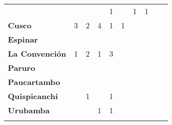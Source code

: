 \begin{tabular}{lccccccccc}
	&\cellcolor[HTML]{FCC46C}					
	&\cellcolor[HTML]{FCC46C}
	&\cellcolor[HTML]{FCC46C}					
	&1
	&\cellcolor[HTML]{FCC46C}
	&1
	&1
	&\cellcolor[HTML]{FCC46C}\\
	\textbf{Cusco}      															
	&3											
	&2
	&4											
	&1
	&1
	&\cellcolor[HTML]{FCC46C}
	&\cellcolor[HTML]{FCC46C}
	&\cellcolor[HTML]{FCC46C}\\								
	\textbf{Espinar}       					             							
	&\cellcolor[HTML]{FCC46C}					
	&\cellcolor[HTML]{FCC46C}
	&\cellcolor[HTML]{FCC46C}					
	&\cellcolor[HTML]{FCC46C}
	&\cellcolor[HTML]{FCC46C}					
	&\cellcolor[HTML]{FCC46C}
	&\cellcolor[HTML]{FCC46C}
	&\cellcolor[HTML]{FCC46C}\\	
	\textbf{La Convención}       
	&1											
	&2											
	&1											
	&3
	&\cellcolor[HTML]{FCC46C}
	&\cellcolor[HTML]{FCC46C}
	&\cellcolor[HTML]{FCC46C}
	&\cellcolor[HTML]{FCC46C}\\	
	\textbf{Paruro}                            					
	&\cellcolor[HTML]{FCC46C}					
	&\cellcolor[HTML]{FCC46C}					
	&\cellcolor[HTML]{FCC46C}					
	&\cellcolor[HTML]{FCC46C}					
	&\cellcolor[HTML]{FCC46C}
	&\cellcolor[HTML]{FCC46C} 					
	&\cellcolor[HTML]{FCC46C}
	&\cellcolor[HTML]{FCC46C}\\
	\textbf{Paucartambo}               		                       					
	&\cellcolor[HTML]{FCC46C}					
	&\cellcolor[HTML]{FCC46C}
	&\cellcolor[HTML]{FCC46C}					
	&\cellcolor[HTML]{FCC46C}
	&\cellcolor[HTML]{FCC46C}					
	&\cellcolor[HTML]{FCC46C}
	&\cellcolor[HTML]{FCC46C}
	&\cellcolor[HTML]{FCC46C}\\
	\textbf{Quispicanchi}          	      				
	&\cellcolor[HTML]{FCC46C}					
	&1											
	&\cellcolor[HTML]{FCC46C}					
	&1
	&\cellcolor[HTML]{FCC46C}
	&\cellcolor[HTML]{FCC46C}
	&\cellcolor[HTML]{FCC46C}
	&\cellcolor[HTML]{FCC46C}\\
	\textbf{Urubamba}  					
	&\cellcolor[HTML]{FCC46C}					
	&\cellcolor[HTML]{FCC46C}					
	&1											
	&1	
	&\cellcolor[HTML]{FCC46C}
	&\cellcolor[HTML]{FCC46C}
	&\cellcolor[HTML]{FCC46C}
	&\cellcolor[HTML]{FCC46C}\\						
	&\multicolumn{1}{l}{}                       &\multicolumn{1}{l}{}            &\multicolumn{1}{l}{}                         
	&\multicolumn{1}{l}{}                       &\multicolumn{1}{l}{}            &\multicolumn{1}{l}{}                       &\multicolumn{1}{l}{}                       &\multicolumn{1}{l}{}            			    
\end{tabular}
